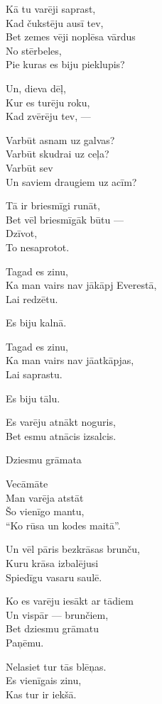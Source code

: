 \documentclass[14pt]{extarticle}
\begin{document}
Kā tu varēji saprast,\\
Kad čukstēju ausī tev,\\
Bet zemes vēji noplēsa vārdus\\
No stērbeles,\\
Pie kuras es biju pieklupis?

Un, dieva dēļ,\\
Kur es turēju roku,\\
Kad zvērēju tev, ---

Varbūt asnam uz galvas?\\
Varbūt skudrai uz ceļa?\\
Varbūt sev\\
Un saviem draugiem uz acīm?

Tā ir briesmīgi runāt,\\
Bet vēl briesmīgāk būtu ---\\
Dzīvot,\\
To nesaprotot.

Tagad es zinu,\\
Ka man vairs nav jākāpj Everestā,\\
Lai redzētu.

Es biju kalnā.

Tagad es zinu,\\
Ka man vairs nav jāatkāpjas,\\
Lai saprastu.

Es biju tālu.

Es varēju atnākt noguris,\\
Bet esmu atnācis izsalcis.


\newpage

{\large \sc Dziesmu grāmata}

Vecāmāte\\
Man varēja atstāt\\
Šo vienīgo mantu,\\
``Ko rūsa un kodes maitā''.

Un vēl pāris bezkrāsas brunču,\\
Kuru krāsa izbalējusi\\
Spiedīgu vasaru saulē.

Ko es varēju iesākt ar tādiem\\
Un vispār --- brunčiem,\\
Bet dziesmu grāmatu\\
Paņēmu.

Nelasiet tur tās blēņas.\\
Es vienīgais zinu,\\
Kas tur ir iekšā.
\end{document}
